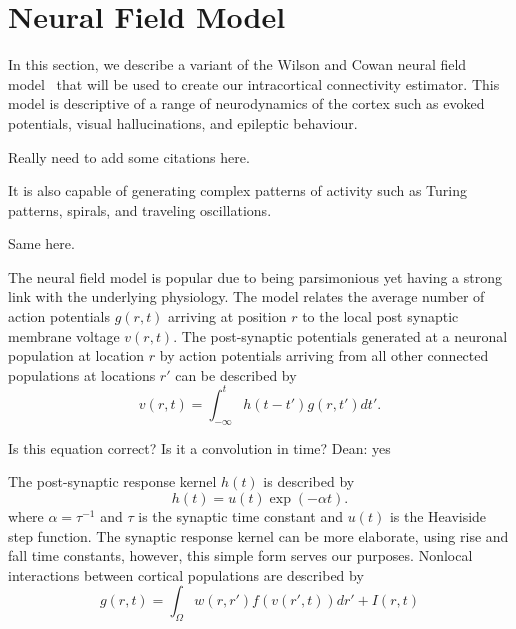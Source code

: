 \documentclass[onecolumn,draftcls]{IEEEtran}
\begin{document}
\section{Neural Field Model}
In this section, we describe a variant of the  Wilson and Cowan neural field model~\cite{Wilson1973} that will be used to create our intracortical connectivity estimator. This model is descriptive of a range of neurodynamics of the cortex such as evoked potentials, visual hallucinations, and epileptic behaviour. 
\begin{todo}
	{Really need to add some citations here.}
\end{todo}
It is also capable of generating complex patterns of activity such as Turing patterns, spirals, and traveling oscillations. 
\begin{todo}
	{Same here.}
\end{todo}
The neural field model is popular due to being parsimonious yet having a strong link with the underlying physiology. The model relates the average number of action potentials $g(r,t)$ arriving at position $r$ to the local post synaptic membrane voltage $v(r,t)$. The post-synaptic potentials generated at a neuronal population at location $r$ by action potentials arriving from all other connected populations at locations $r'$ can be described by
\begin{equation}\label{SpikesToPotential}
	v\left( {r,t} \right) = \int_{ - \infty }^t {h\left( {t - t'} \right)g\left( {r,t'} \right)dt'}.
\end{equation}
\begin{todo}
	{Is this equation correct? Is it a convolution in time? Dean: yes}
\end{todo}
The post-synaptic response kernel $h(t)$ is described by
\begin{equation}\label{SynapticRespKernel}
	h(t) = u(t)\exp{\left(-\alpha t\right)}.
\end{equation}
where $\alpha=\tau^{-1}$ and $\tau$ is the synaptic time constant and $u(t)$ is the Heaviside step function. The synaptic response kernel can be more elaborate, using rise and fall time constants, however, this simple form serves our purposes. Nonlocal interactions between cortical populations are described by	
\begin{equation}\label{RateBasedInteractions}
	g\left( r,t \right) = \int_\Omega  {w\left( r,r' \right)f\left( v\left( r',t \right) \right)dr'} + I\left(r,t\right)
\end{equation}
\end{document}
